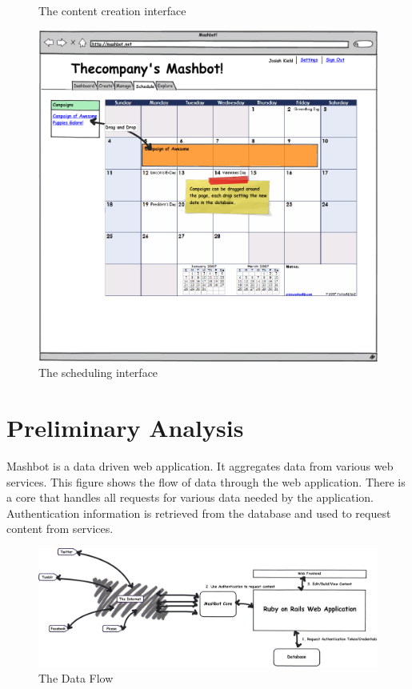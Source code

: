 \documentclass{article}
\begin{document}
\begin{description}
\begin{figure}
\caption{The content creation interface}
\label{create}
\end{figure}
\clearpage
\begin{figure}
\centering
\includegraphics[scale=0.35]{../mockups/schedule.png}
\caption{The scheduling interface}
\label{schedule}
\end{figure}
\clearpage
\section{Preliminary Analysis} %
Mashbot is a data driven web application.  It aggregates data from
various web services.  This figure shows the flow of data through the
web application.  There is a core that handles all requests for
various data needed by the application.  Authentication information is
retrieved from the database and used to request content from services.

\begin{figure}
\centering
\includegraphics[scale=0.3]{../mockups/dataflow.png}
\caption{The Data Flow}
\end{figure}
\begin{figure}
\label{dataflow}
\end{figure}


\end{description}
\end{document}

